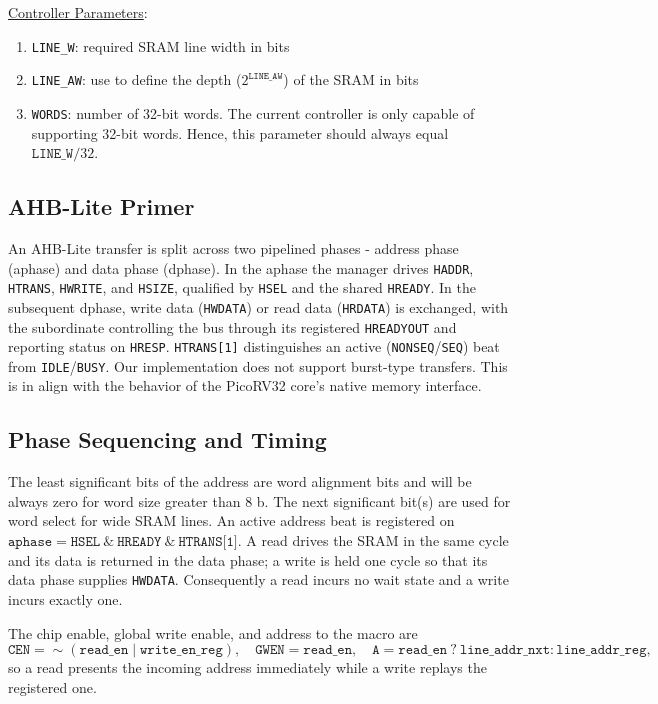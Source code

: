 \underline{Controller Parameters}:
\begin{enumerate}
    \item \texttt{LINE\_W}: required SRAM line width in bits
    \item \texttt{LINE\_AW}: use to define the depth (\(2^{\texttt{LINE\_AW}}\)) of the SRAM in bits
    \item \texttt{WORDS}: number of 32-bit words. The current controller is only capable of supporting 32-bit words. Hence, this parameter should always equal \(\texttt{LINE\_W} / 32\).
\end{enumerate}


\subsection{AHB-Lite Primer}
An AHB-Lite transfer is split across two pipelined phases - address phase (aphase) and data phase (dphase). In the aphase the manager drives \texttt{HADDR}, \texttt{HTRANS}, \texttt{HWRITE}, and \texttt{HSIZE}, qualified by \texttt{HSEL} and the shared \texttt{HREADY}. In the subsequent dphase, write data (\texttt{HWDATA}) or read data (\texttt{HRDATA}) is exchanged, with the subordinate controlling the bus through its registered \texttt{HREADYOUT} and reporting status on \texttt{HRESP}. \texttt{HTRANS[1]} distinguishes an active (\texttt{NONSEQ}/\texttt{SEQ}) beat from \texttt{IDLE}/\texttt{BUSY}. Our implementation does not support burst-type transfers. This is in align with the behavior of the PicoRV32 core's native memory interface. 

\subsection{Phase Sequencing and Timing}
The least significant bits of the address are word alignment bits and will be always zero for word size greater than 8 b. The next significant bit(s) are used for word select for wide SRAM lines.  
An active address beat is registered on \(\texttt{aphase} = \texttt{HSEL}\ \&\ \texttt{HREADY}\ \&\ \texttt{HTRANS[1]}\). A read drives the SRAM in the same cycle and its data is returned in the data phase; a write is held one cycle so that its data phase supplies \texttt{HWDATA}. Consequently a read incurs no wait state and a write incurs exactly one. 

The chip enable, global write enable, and address to the macro are
\[
\texttt{CEN} = \sim(\texttt{read\_en} \mid \texttt{write\_en\_reg}), \quad
\texttt{GWEN} = \texttt{read\_en}, \quad
\texttt{A} = \texttt{read\_en}\ ?\ \texttt{line\_addr\_nxt} : \texttt{line\_addr\_reg},
\]
so a read presents the incoming address immediately while a write replays the registered one.

